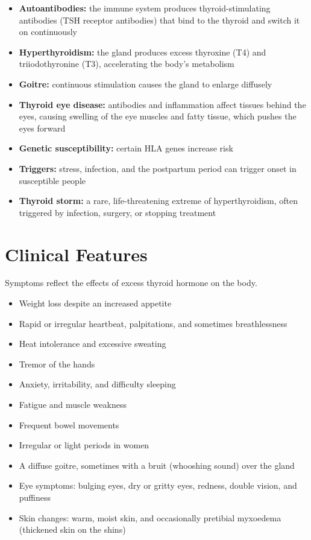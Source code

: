 \begin{itemize}
    \item \textbf{Autoantibodies:} the immune system produces thyroid-stimulating antibodies (TSH receptor antibodies) that bind to the thyroid and switch it on continuously
    \item \textbf{Hyperthyroidism:} the gland produces excess thyroxine (T4) and triiodothyronine (T3), accelerating the body's metabolism
    \item \textbf{Goitre:} continuous stimulation causes the gland to enlarge diffusely
    \item \textbf{Thyroid eye disease:} antibodies and inflammation affect tissues behind the eyes, causing swelling of the eye muscles and fatty tissue, which pushes the eyes forward
    \item \textbf{Genetic susceptibility:} certain HLA genes increase risk
    \item \textbf{Triggers:} stress, infection, and the postpartum period can trigger onset in susceptible people
    \item \textbf{Thyroid storm:} a rare, life-threatening extreme of hyperthyroidism, often triggered by infection, surgery, or stopping treatment
\end{itemize}

\section*{Clinical Features}
Symptoms reflect the effects of excess thyroid hormone on the body.

\begin{itemize}
    \item Weight loss despite an increased appetite
    \item Rapid or irregular heartbeat, palpitations, and sometimes breathlessness
    \item Heat intolerance and excessive sweating
    \item Tremor of the hands
    \item Anxiety, irritability, and difficulty sleeping
    \item Fatigue and muscle weakness
    \item Frequent bowel movements
    \item Irregular or light periods in women
    \item A diffuse goitre, sometimes with a bruit (whooshing sound) over the gland
    \item Eye symptoms: bulging eyes, dry or gritty eyes, redness, double vision, and puffiness
    \item Skin changes: warm, moist skin, and occasionally pretibial myxoedema (thickened skin on the shins)
\end{itemize}

